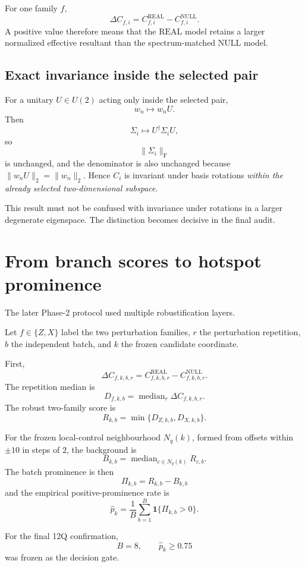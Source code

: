\documentclass[11pt,a4paper]{article}
\newcommand{\Real}{\mathrm{REAL}}
\newcommand{\Null}{\mathrm{NULL}}
\newcommand{\Prom}{\Pi}
\newcommand{\med}{\operatorname{median}}
\newcommand{\fro}{\mathrm F}
\begin{document}
For one family \(f\),
\[
\Delta C_{f,i}
=
C_{f,i}^{\Real}-C_{f,i}^{\Null}.
\]
A positive value therefore means that the \(\Real\) model retains a larger
normalized effective resultant than the spectrum-matched \(\Null\) model.

\subsection{Exact invariance inside the selected pair}

For a unitary \(U\in U(2)\) acting only inside the selected pair,
\[
w_n\mapsto w_nU.
\]
Then
\[
\Sigma_i\mapsto U^\dagger\Sigma_iU,
\]
so
\[
\|\Sigma_i\|_{\fro}
\]
is unchanged, and the denominator is also unchanged because
\(\|w_nU\|_2=\|w_n\|_2\).  Hence \(C_i\) is invariant under basis rotations
\emph{within the already selected two-dimensional subspace}.

This result must not be confused with invariance under rotations in a larger
degenerate eigenspace.  The distinction becomes decisive in the final audit.

\section{From branch scores to hotspot prominence}

The later Phase-2 protocol used multiple robustification layers.

Let \(f\in\{Z,X\}\) label the two perturbation families, \(r\) the perturbation
repetition, \(b\) the independent batch, and \(k\) the frozen candidate
coordinate.

First,
\[
\Delta C_{f,k,b,r}
=
C^{\Real}_{f,k,b,r}
-
C^{\Null}_{f,k,b,r}.
\]
The repetition median is
\[
D_{f,k,b}
=
\med_r \Delta C_{f,k,b,r}.
\]
The robust two-family score is
\[
R_{k,b}
=
\min\{D_{Z,k,b},D_{X,k,b}\}.
\]

For the frozen local-control neighbourhood \(N_q(k)\), formed from offsets
within \(\pm10\) in steps of \(2\), the background is
\[
B_{k,b}
=
\med_{c\in N_q(k)} R_{c,b}.
\]
The batch prominence is then
\[
\boxed{
\Prom_{k,b}
=
R_{k,b}-B_{k,b}
}
\]
and the empirical positive-prominence rate is
\[
\widehat p_k
=
\frac1B
\sum_{b=1}^{B}
\mathbf 1\{\Prom_{k,b}>0\}.
\]

For the final 12Q confirmation,
\[
B=8,
\qquad
\widehat p_k\ge0.75
\]
was frozen as the decision gate.
\end{document}
